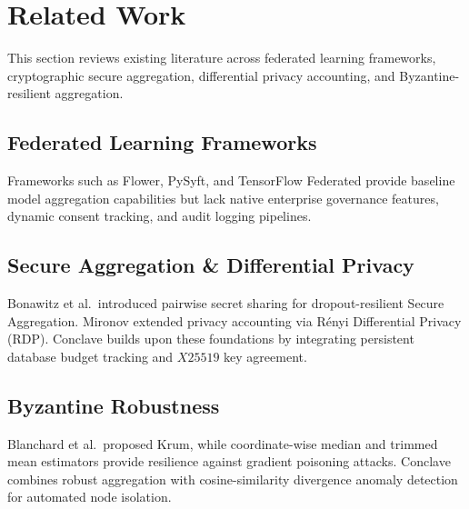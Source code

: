 \section{Related Work}
\label{sec:related_work}

This section reviews existing literature across federated learning frameworks, cryptographic secure aggregation, differential privacy accounting, and Byzantine-resilient aggregation.

\subsection{Federated Learning Frameworks}
Frameworks such as Flower, PySyft, and TensorFlow Federated provide baseline model aggregation capabilities but lack native enterprise governance features, dynamic consent tracking, and audit logging pipelines.

\subsection{Secure Aggregation \& Differential Privacy}
Bonawitz et al.\ introduced pairwise secret sharing for dropout-resilient Secure Aggregation. Mironov extended privacy accounting via Rényi Differential Privacy (RDP). Conclave builds upon these foundations by integrating persistent database budget tracking and $X25519$ key agreement.

\subsection{Byzantine Robustness}
Blanchard et al.\ proposed Krum, while coordinate-wise median and trimmed mean estimators provide resilience against gradient poisoning attacks. Conclave combines robust aggregation with cosine-similarity divergence anomaly detection for automated node isolation.
